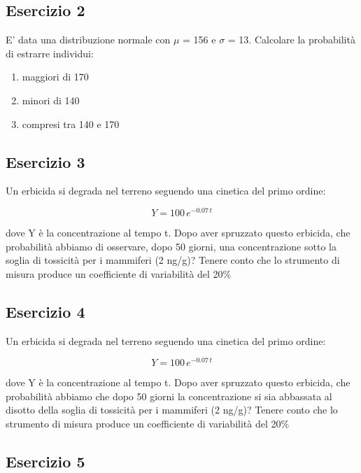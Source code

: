 \documentclass[a4paper,12pt,oneside]{book}
\providecommand{\tightlist}{%
  \setlength{\itemsep}{0pt}\setlength{\parskip}{0pt}}
\begin{document}
\hypertarget{esercizio-2-1}{%
\subsection{Esercizio 2}\label{esercizio-2-1}}

E' data una distribuzione normale con \(\mu\) = 156 e \(\sigma\) = 13. Calcolare la probabilità di estrarre individui:

\begin{enumerate}
\def\labelenumi{\arabic{enumi}.}
\tightlist
\item
  maggiori di 170
\item
  minori di 140
\item
  compresi tra 140 e 170
\end{enumerate}

\hypertarget{esercizio-3-1}{%
\subsection{Esercizio 3}\label{esercizio-3-1}}

Un erbicida si degrada nel terreno seguendo una cinetica del primo ordine:

\[Y = 100 \, e^{-0.07 \, t}\]

dove Y è la concentrazione al tempo t. Dopo aver spruzzato questo erbicida, che probabilità abbiamo di osservare, dopo 50 giorni, una concentrazione sotto la soglia di tossicità per i mammiferi (2 ng/g)? Tenere conto che lo strumento di misura produce un coefficiente di variabilità del 20\%

\hypertarget{esercizio-4}{%
\subsection{Esercizio 4}\label{esercizio-4}}

Un erbicida si degrada nel terreno seguendo una cinetica del primo ordine:

\[Y = 100 \, e^{-0.07 \, t}\]

dove Y è la concentrazione al tempo t. Dopo aver spruzzato questo erbicida, che probabilità abbiamo che dopo 50 giorni la concentrazione si sia abbassata al disotto della soglia di tossicità per i mammiferi (2 ng/g)? Tenere conto che lo strumento di misura produce un coefficiente di variabilità del 20\%

\hypertarget{esercizio-5}{%
\subsection{Esercizio 5}\label{esercizio-5}}
\end{document}
